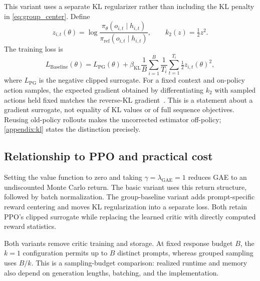 This variant uses a separate KL regularizer rather than including the KL penalty in \cref{eq:group_center}. Define
\begin{equation}
 z_{i,t}(\theta)=\log\frac{\pi_\theta(o_{i,t}\mid h_{i,t})}{\pi_{\mathrm{ref}}(o_{i,t}\mid h_{i,t})},
 \qquad k_2(z)=\tfrac12 z^2.
\end{equation}
The training loss is
\begin{equation}
 L_{\mathrm{Baseline}}(\theta)=L_{\mathrm{PG}}(\theta)
 +\beta_{\mathrm{KL}}\frac{1}{B}\sum_{i=1}^{B}
 \frac{1}{T_i}\sum_{t=1}^{T_i}\tfrac12 z_{i,t}(\theta)^2,
 \label{eq:baseline_loss}
\end{equation}
where $L_{\mathrm{PG}}$ is the negative clipped surrogate. For a fixed context and on-policy action samples, the expected gradient obtained by differentiating $k_2$ with sampled actions held fixed matches the reverse-KL gradient~\citep{liu2025rethinking}. This is a statement about a gradient surrogate, not equality of KL values or of full sequence objectives. Reusing old-policy rollouts makes the uncorrected estimator off-policy; \cref{appendix:kl} states the distinction precisely.

\subsection{Relationship to PPO and practical cost}
Setting the value function to zero and taking $\gamma=\lambda_{\mathrm{GAE}}=1$ reduces GAE to an undiscounted Monte Carlo return. The basic variant uses this return structure, followed by batch normalization. The group-baseline variant adds prompt-specific reward centering and moves KL regularization into a separate loss. Both retain PPO's clipped surrogate while replacing the learned critic with directly computed reward statistics.

Both variants remove critic training and storage. At fixed response budget $B$, the $k=1$ configuration permits up to $B$ distinct prompts, whereas grouped sampling uses $B/k$. This is a sampling-budget comparison: realized runtime and memory also depend on generation lengths, batching, and the implementation.
